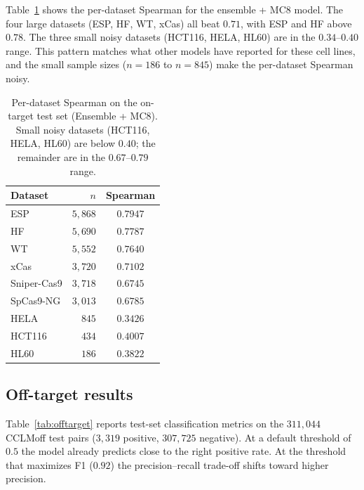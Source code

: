 \documentclass[11pt,a4paper]{article}
\begin{document}
Table~\ref{tab:perdataset} shows the per-dataset Spearman for the ensemble + MC8 model. The four large datasets (ESP, HF, WT, xCas) all beat $0.71$, with ESP and HF above $0.78$. The three small noisy datasets (HCT116, HELA, HL60) are in the $0.34$--$0.40$ range. This pattern matches what other models have reported for these cell lines, and the small sample sizes ($n{=}186$ to $n{=}845$) make the per-dataset Spearman noisy.

\begin{table}[h]
\centering
\caption{Per-dataset Spearman on the on-target test set (Ensemble + MC8). Small noisy datasets (HCT116, HELA, HL60) are below $0.40$; the remainder are in the $0.67$--$0.79$ range.}
\label{tab:perdataset}
\small
\begin{tabular}{lrc}
\toprule
Dataset & $n$ & Spearman \\
\midrule
ESP         & $5{,}868$ & $0.7947$ \\
HF          & $5{,}690$ & $0.7787$ \\
WT          & $5{,}552$ & $0.7640$ \\
xCas        & $3{,}720$ & $0.7102$ \\
Sniper-Cas9 & $3{,}718$ & $0.6745$ \\
SpCas9-NG   & $3{,}013$ & $0.6785$ \\
HELA        & $845$    & $0.3426$ \\
HCT116      & $434$    & $0.4007$ \\
HL60        & $186$    & $0.3822$ \\
\bottomrule
\end{tabular}
\end{table}

\subsection{Off-target results}

Table~\ref{tab:offtarget} reports test-set classification metrics on the $311{,}044$ CCLMoff test pairs ($3{,}319$ positive, $307{,}725$ negative). At a default threshold of $0.5$ the model already predicts close to the right positive rate. At the threshold that maximizes F1 ($0.92$) the precision--recall trade-off shifts toward higher precision.
\end{document}
